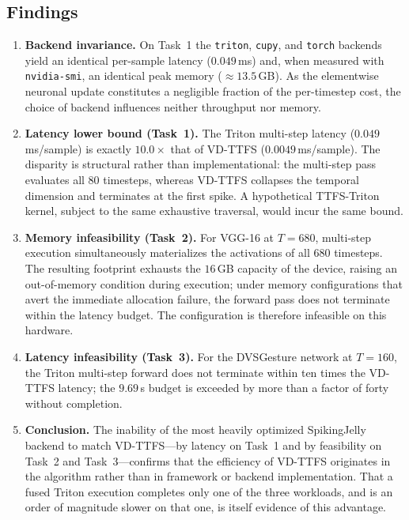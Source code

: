 \documentclass[runningheads]{llncs}
\begin{document}
\subsection{Findings}\label{app:sjfused-find}
\begin{enumerate}
  \item \textbf{Backend invariance.} On Task~1 the \texttt{triton}, \texttt{cupy},
    and \texttt{torch} backends yield an identical per-sample latency
    ($0.049$\,ms) and, when measured with \texttt{nvidia-smi}, an identical peak
    memory ($\approx13.5$\,GB). As the elementwise neuronal update constitutes a
    negligible fraction of the per-timestep cost, the choice of backend influences
    neither throughput nor memory.
  \item \textbf{Latency lower bound (Task~1).} The Triton multi-step latency
    ($0.049$\,ms/sample) is exactly $10.0\times$ that of VD-TTFS
    ($0.0049$\,ms/sample). The disparity is structural rather than
    implementational: the multi-step pass evaluates all $80$ timesteps, whereas
    VD-TTFS collapses the temporal dimension and terminates at the first spike. A
    hypothetical TTFS-Triton kernel, subject to the same exhaustive traversal,
    would incur the same bound.
  \item \textbf{Memory infeasibility (Task~2).} For VGG-16 at $T{=}680$, multi-step
    execution simultaneously materializes the activations of all $680$ timesteps.
    The resulting footprint exhausts the $16$\,GB capacity of the device, raising an
    out-of-memory condition during execution; under memory configurations that
    avert the immediate allocation failure, the forward pass does not terminate
    within the latency budget. The configuration is therefore infeasible on this
    hardware.
  \item \textbf{Latency infeasibility (Task~3).} For the DVSGesture network at
    $T{=}160$, the Triton multi-step forward does not terminate within ten times
    the VD-TTFS latency; the $9.69$\,s budget is exceeded by more than a factor of
    forty without completion.
  \item \textbf{Conclusion.} The inability of the most heavily optimized
    SpikingJelly backend to match VD-TTFS---by latency on Task~1 and by feasibility
    on Task~2 and Task~3---confirms that the efficiency of VD-TTFS originates in the
    algorithm rather than in framework or backend implementation. That a fused
    Triton execution completes only one of the three workloads, and is an order of
    magnitude slower on that one, is itself evidence of this advantage.
\end{enumerate}
\end{document}
